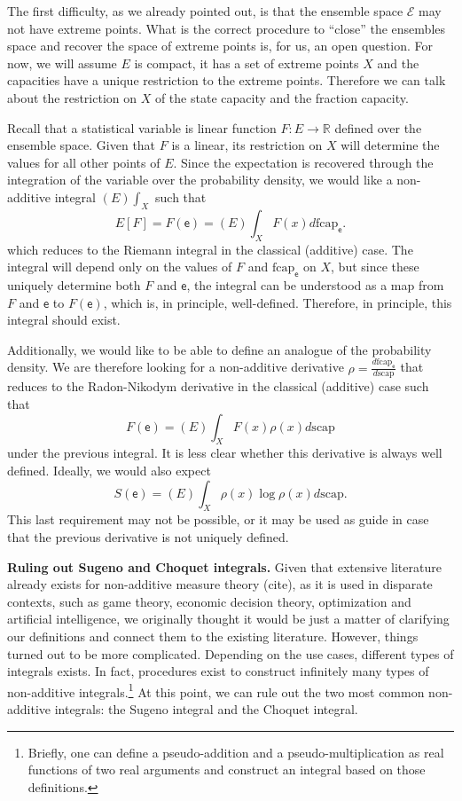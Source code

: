 \documentclass[10pt,twocolumn, nofootinbib]{revtex4-2}
\newcommand\capacity{\mathrm{scap}}
\newcommand\frcap{\mathrm{fcap}}
\newcommand{\ens}[1][e] {\mathsf{#1}} %
\newcommand{\Ens}[1][E] {\mathcal{#1}} %
\begin{document}
The first difficulty, as we already pointed out, is that the ensemble space $\Ens$ may not have extreme points. What is the correct procedure to ``close'' the ensembles space and recover the space of extreme points is, for us, an open question. For now, we will assume $E$ is compact, it has a set of extreme points $X$ and the capacities have a unique restriction to the extreme points. Therefore we can talk about the restriction on $X$ of the state capacity and the fraction capacity.

Recall that a statistical variable is linear function $F : E \to \mathbb{R}$ defined over the ensemble space. Given that $F$ is a linear, its restriction on $X$ will determine the values for all other points of $E$. Since the expectation is recovered through the integration of the variable over the probability density, we would like a non-additive integral $(E)\int_X$ such that
\begin{equation}
	E[F] = F(\ens) = (E)\int_X F(x) d\frcap_{\ens}.
\end{equation}
which reduces to the Riemann integral in the classical (additive) case. The integral will depend only on the values of $F$ and $\frcap_{\ens}$ on $X$, but since these uniquely determine both $F$ and $\ens$, the integral can be understood as a map from $F$ and $\ens$ to $F(\ens)$, which is, in principle, well-defined. Therefore, in principle, this integral should exist.

Additionally, we would like to be able to define an analogue of the probability density. We are therefore looking for a non-additive derivative $\rho = \frac{d \frcap_{\ens}}{d \capacity}$ that reduces to the Radon-Nikodym derivative in the classical (additive) case such that
\begin{equation}
	F(\ens) = (E)\int_X F(x) \rho(x) d\capacity
\end{equation}
under the previous integral. It is less clear whether this derivative is always well defined. Ideally, we would also expect
\begin{equation}
	S(\ens) = (E)\int_X \rho(x) \log \rho(x) d\capacity.
\end{equation}
This last requirement may not be possible, or it may be used as guide in case that the previous derivative is not uniquely defined.

\textbf{Ruling out Sugeno and Choquet integrals.} Given that extensive literature already exists for non-additive measure theory (cite), as it is used in disparate contexts, such as game theory, economic decision theory, optimization and artificial intelligence, we originally thought it would be just a matter of clarifying our definitions and connect them to the existing literature. However, things turned out to be more complicated. Depending on the use cases, different types of integrals exists. In fact, procedures exist\cite{nonadditive2014,pap2013} to construct infinitely many types of non-additive integrals.\footnote{Briefly, one can define a pseudo-addition and a pseudo-multiplication as real functions of two real arguments and construct an integral based on those definitions.} At this point, we can rule out the two most common non-additive integrals: the Sugeno integral and the Choquet integral.
\end{document}
